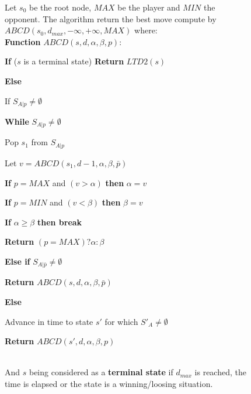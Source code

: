 \begin{figure}[h!t]
    \begin{algorithm}
Let $s_0$ be the root node, $MAX$ be the player and $MIN$ the opponent. The algorithm return the best move compute by $ABCD(s_0,d_{max},-\infty,+\infty,MAX)$ where: \ \\

        \textbf{Function} $ABCD(s,d,\alpha,\beta,p)$:
        \begin{enum}
        \item \textbf{If} ($s$ is a terminal state) \textbf{Return} $LTD2(s)$
        \item \textbf{Else}
            \begin{enum}
            \item If $S_{A|p} \neq \emptyset$ 

            \begin{enum}
            \item \textbf{While} $S_{A|p} \neq \emptyset$
                \begin{enum}
                \item Pop $s_1$ from $S_{A|p}$ 
                \item Let $v = ABCD(s_1,d-1,\alpha,\beta,\bar{p})$
                \item \textbf{If} $p = MAX$ and $(v > \alpha)$ \textbf{then} $\alpha = v$
                \item \textbf{If} $p = MIN$ and $(v < \beta)$ \textbf{then} $\beta= v$
                \item \textbf{If} $\alpha \geq \beta$ \textbf{then break} 
                \end{enum}
            \item \textbf{Return} $(p = MAX) ? \alpha : \beta$ 
            \end{enum}
        \item \textbf{Else if} $S_{A|\bar{p}} \neq \emptyset$
            \begin{enum}
            \item \textbf{Return} $ABCD(s,d,\alpha,\beta,\bar{p})$
            \end{enum}
        \item \textbf{Else} 
            \begin{enum}
            \item Advance in time to state $s'$ for which $S'_A \neq \emptyset$
            \item \textbf{Return} $ABCD(s',d,\alpha,\beta,p)$
            \end{enum}
        \end{enum}
        \end{enum}
        \ \\
        And $s$ being considered as a \textbf{terminal state} if $d_{max}$ is reached, the time is elapsed or the state is a winning/loosing situation.
        \label{algABCD}
    \end{algorithm}
\end{figure}

